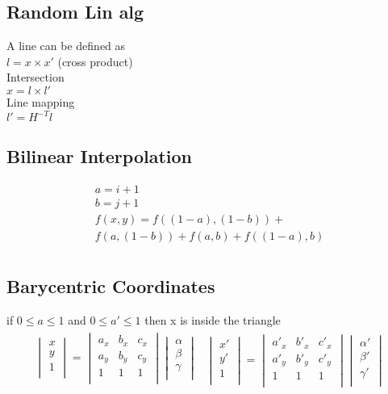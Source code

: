 \documentclass[8pt, english]{article}
\begin{document}
\begin{multicols}{3}
\subsection*{Random Lin alg}
A line can be defined as \\
$l = x \times x'$ (cross product) \\
Intersection \\ 
$ x = l \times l' $ \\ 
Line mapping \\
$l' = H^{-T} l $ \\
\subsection*{Bilinear Interpolation}
\begin{align*}
 a =  i +1 \\
 b = j + 1\\
f(x,y) = f((1 -a) ,(1 -b)) + \\
f(a,(1 -b)) + f(a,b) + f((1 - a),b)\\
\end{align*}
\subsection*{Barycentric Coordinates}
if $0 \leq a \leq 1$ and  
$0 \leq a' \leq 1$ then 
x is inside the triangle 
\begin{align*}
\begin{split}
\begin{vmatrix}
 x\\ y \\ 1\\
\end{vmatrix} = \begin{vmatrix}
 a_x & b_x  & c_x\\ a_y & b_y & c_y \\ 1 & 1 & 1\\
\end{vmatrix} 
\begin{vmatrix}
\alpha \\ \beta \\ \gamma\\
\end{vmatrix} \\ 
\end{split}
\begin{split}
\begin{vmatrix}
 x'\\ y '\\ 1\\
\end{vmatrix} = \begin{vmatrix}
 a'_x & b'_x  & c'_x\\ a'_y & b'_y & c'_y \\ 1 & 1 & 1\\
\end{vmatrix} 
\begin{vmatrix}
\alpha' \\ \beta' \\ \gamma'\\
\end{vmatrix} 
\end{split}
\end{align*}

\end{multicols}
\end{document}
